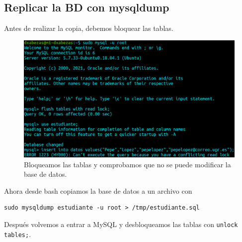 \documentclass{article}
\begin{document}
\subsection{Replicar la BD con mysqldump}

Antes de realizar la copia, debemos bloquear las tablas.

\begin{figure}[H]
	\centering
	\includegraphics[width=150mm]{imgs/lock}
	\caption{Bloqueamos las tablas y comprobamos que no se puede modificar la base de datos.}
	\label{fig:lock}
\end{figure}

Ahora desde bash copiamos la base de datos a un archivo con
\begin{Verbatim}
sudo mysqldump estudiante -u root > /tmp/estudiante.sql
\end{Verbatim}
Después volvemos a entrar a MySQL y desbloqueamos las tablas con \verb|unlock tables;|.
\end{document}
